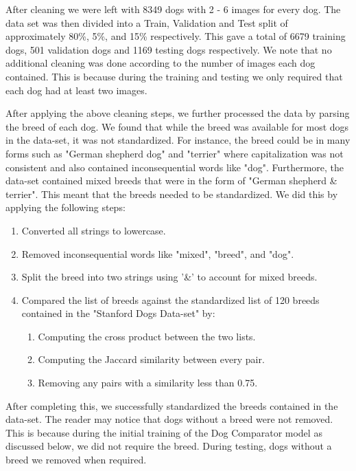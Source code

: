 \documentclass{article}
\begin{document}
\noindent After cleaning we were left with 8349 dogs with 2 - 6 images for every dog.  The data set was then divided into a Train, Validation and Test split of approximately 80\%, 5\%, and 15\% respectively.  This gave a total of 6679 training dogs, 501 validation dogs and 1169 testing dogs respectively.  We note that no additional cleaning was done according to the number of images each dog contained.  This is because during the training and testing we only required that each dog had at least two images.

After applying the above cleaning steps, we further processed the data by parsing the breed of each dog.  We found that while the breed was available for most dogs in the data-set, it was not standardized.  For instance, the breed could be in many forms such as "German shepherd dog" and "terrier" where capitalization was not consistent and also contained inconsequential words like "dog".  Furthermore, the data-set contained mixed breeds that were in the form of "German shepherd \& terrier".  This meant that the breeds needed to be standardized.  We did this by applying the following steps:

\begin{enumerate}
  \item Converted all strings to lowercase.
  
  \item Removed inconsequential words like "mixed", "breed", and "dog".
  
  \item Split the breed into two strings using '\&' to account for mixed breeds.
    
  \item Compared the list of breeds against the standardized list of 120 breeds contained in the "Stanford Dogs Data-set" \cite{stanforddogs} by:
    \begin{enumerate}
      \item Computing the cross product between the two lists.
      \item Computing the Jaccard similarity between every pair.
      \item Removing any pairs with a similarity less than 0.75.
    \end{enumerate}
\end{enumerate} 

\noindent After completing this, we successfully standardized the breeds contained in the data-set.  The reader may notice that dogs without a breed were not removed.  This is because during the initial training of the Dog Comparator model as discussed below, we did not require the breed.  During testing, dogs without a breed we removed when required.
\end{document}
